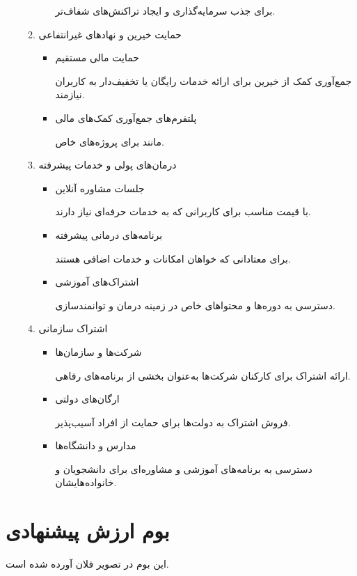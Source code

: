 \documentclass[dvipsnames, svgnames, x11names, 11pt]{article}
\begin{document}
\begin{itemize}
\begin{enumerate}
\begin{itemize}
برای جذب سرمایه‌گذاری و ایجاد تراکنش‌های شفاف‌تر.  
\end{itemize}

\item 
حمایت خیرین و نهادهای غیرانتفاعی  
\begin{itemize}
\item 
حمایت مالی مستقیم

جمع‌آوری کمک از خیرین برای ارائه خدمات رایگان یا تخفیف‌دار به کاربران نیازمند.  

\item 
پلتفرم‌های جمع‌آوری کمک‌های مالی

مانند  برای پروژه‌های خاص.  
\end{itemize}

\item 
درمان‌های پولی و خدمات پیشرفته  
\begin{itemize}
\item 
جلسات مشاوره آنلاین

با قیمت مناسب برای کاربرانی که به خدمات حرفه‌ای نیاز دارند.  

\item 
برنامه‌های درمانی پیشرفته

برای معتادانی که خواهان امکانات و خدمات اضافی هستند.  

\item 
اشتراک‌های آموزشی

دسترسی به دوره‌ها و محتواهای خاص در زمینه درمان و توانمندسازی.  
\end{itemize}

\item 
اشتراک سازمانی   
\begin{itemize}
\item 
شرکت‌ها و سازمان‌ها

ارائه اشتراک برای کارکنان شرکت‌ها به‌عنوان بخشی از برنامه‌های رفاهی.  

\item 
ارگان‌های دولتی

فروش اشتراک به دولت‌ها برای حمایت از افراد آسیب‌پذیر.  

\item 
مدارس و دانشگاه‌ها

دسترسی به برنامه‌های آموزشی و مشاوره‌ای برای دانشجویان و خانواده‌هایشان.  
\end{itemize}
\end{enumerate}
\end{itemize}

\section{بوم ارزش پیشنهادی}
این بوم در تصویر فلان آورده شده است.
\end{document}
